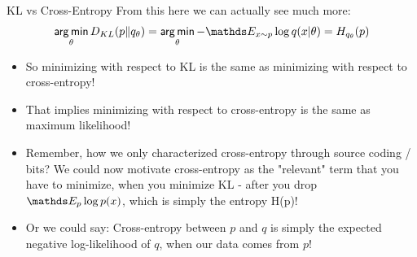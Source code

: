 \begin{vbframe}{KL vs Cross-Entropy}
From this here we can actually see much more:
$$ \argmin_{\theta} D_{KL}(p \| q_\theta) = \argmin_{\theta} -\E_{x \sim p} \log q(x|\theta) = H_{q_\theta}(p) $$
  \begin{itemize}
    \item So minimizing with respect to KL is the same as minimizing with respect to cross-entropy! 
    \item That implies minimizing with respect to cross-entropy is the same as maximum likelihood!
    \item Remember, how we only characterized cross-entropy through source coding / bits? We could now motivate cross-entropy as the "relevant" term that you have to minimize, when you minimize KL - after you drop $\E_p \log p(x)$, which is simply the entropy H(p)!
    \item Or we could say: Cross-entropy between $p$ and $q$ is simply the expected negative log-likelihood of $q$, when our data comes from $p$!
  \end{itemize}
\end{vbframe}

